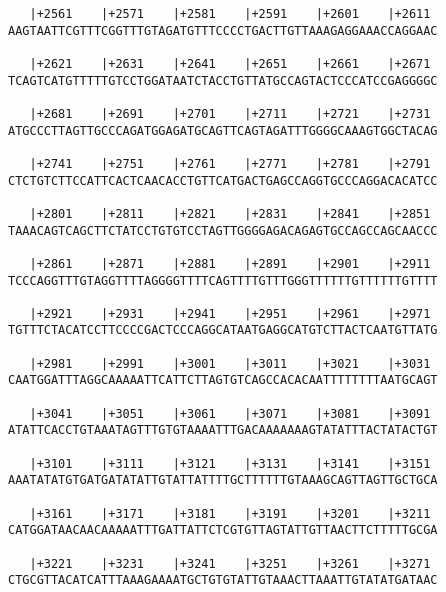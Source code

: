 \documentclass{article}
\begin{document}
\begin{Verbatim}
   |+2561    |+2571    |+2581    |+2591    |+2601    |+2611 
AAGTAATTCGTTTCGGTTTGTAGATGTTTCCCCTGACTTGTTAAAGAGGAAACCAGGAAC
                                                            
   |+2621    |+2631    |+2641    |+2651    |+2661    |+2671 
TCAGTCATGTTTTTGTCCTGGATAATCTACCTGTTATGCCAGTACTCCCATCCGAGGGGC
                                                            
   |+2681    |+2691    |+2701    |+2711    |+2721    |+2731 
ATGCCCTTAGTTGCCCAGATGGAGATGCAGTTCAGTAGATTTGGGGCAAAGTGGCTACAG
                                                            
   |+2741    |+2751    |+2761    |+2771    |+2781    |+2791 
CTCTGTCTTCCATTCACTCAACACCTGTTCATGACTGAGCCAGGTGCCCAGGACACATCC
                                                            
   |+2801    |+2811    |+2821    |+2831    |+2841    |+2851 
TAAACAGTCAGCTTCTATCCTGTGTCCTAGTTGGGGAGACAGAGTGCCAGCCAGCAACCC
                                                            
   |+2861    |+2871    |+2881    |+2891    |+2901    |+2911 
TCCCAGGTTTGTAGGTTTTAGGGGTTTTCAGTTTTGTTTGGGTTTTTTGTTTTTTGTTTT
                                                            
   |+2921    |+2931    |+2941    |+2951    |+2961    |+2971 
TGTTTCTACATCCTTCCCCGACTCCCAGGCATAATGAGGCATGTCTTACTCAATGTTATG
                                                            
   |+2981    |+2991    |+3001    |+3011    |+3021    |+3031 
CAATGGATTTAGGCAAAAATTCATTCTTAGTGTCAGCCACACAATTTTTTTTAATGCAGT
                                                            
   |+3041    |+3051    |+3061    |+3071    |+3081    |+3091 
ATATTCACCTGTAAATAGTTTGTGTAAAATTTGACAAAAAAAGTATATTTACTATACTGT
                                                            
   |+3101    |+3111    |+3121    |+3131    |+3141    |+3151 
AAATATATGTGATGATATATTGTATTATTTTGCTTTTTTGTAAAGCAGTTAGTTGCTGCA
                                                            
   |+3161    |+3171    |+3181    |+3191    |+3201    |+3211 
CATGGATAACAACAAAAATTTGATTATTCTCGTGTTAGTATTGTTAACTTCTTTTTGCGA
                                                            
   |+3221    |+3231    |+3241    |+3251    |+3261    |+3271 
CTGCGTTACATCATTTAAAGAAAATGCTGTGTATTGTAAACTTAAATTGTATATGATAAC
                                                            

\end{Verbatim}
\end{document}
